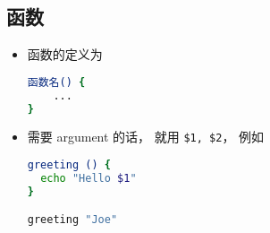 \subsection{函数}

\begin{itemize}
\item 函数的定义为
\begin{lstlisting}[language=bash]
函数名() {
	...
}
\end{lstlisting}
\item 需要 argument 的话， 就用 \verb|$1, $2|， 例如
\begin{lstlisting}[language=bash]
greeting () {
  echo "Hello $1"
}

greeting "Joe"
\end{lstlisting}
\end{itemize}
